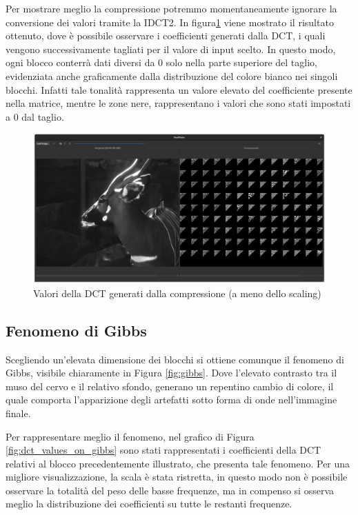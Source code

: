 Per mostrare meglio la compressione potremmo momentaneamente ignorare la conversione dei valori tramite la IDCT2. In figura\ref{fig:compression_values} viene mostrato il risultato ottenuto, dove è possibile osservare i coefficienti generati dalla DCT, i quali vengono successivamente tagliati per il valore di input scelto. In questo modo, ogni blocco conterrà dati diversi da 0 solo nella parte superiore del taglio, evidenziata anche graficamente dalla distribuzione del colore bianco nei singoli blocchi. Infatti tale tonalità rappresenta un valore elevato del coefficiente presente nella matrice, mentre le zone nere, rappresentano i valori che sono stati impostati a 0 dal taglio.

\begin{figure}[h]
	\centering
	\includegraphics[width=1\linewidth]{figures/qt_dct_values}
	\caption{Valori della DCT generati dalla compressione (a meno dello scaling)}
	\label{fig:compression_values}
\end{figure}

\subsection{Fenomeno di Gibbs}

Scegliendo un'elevata dimensione dei blocchi si ottiene comunque il fenomeno di Gibbs, visibile chiaramente in Figura \ref{fig:gibbs}. Dove l'elevato contrasto tra il muso del cervo e il relativo sfondo, generano un repentino cambio di colore, il quale comporta l'apparizione degli artefatti sotto forma di onde nell'immagine finale.

Per rappresentare meglio il fenomeno, nel grafico di Figura \ref{fig:dct_values_on_gibbs} sono stati rappresentati i coefficienti della DCT relativi al blocco precedentemente illustrato, che presenta tale fenomeno. Per una migliore visualizzazione, la scala è stata ristretta, in questo modo non è possibile osservare la totalità del peso delle basse frequenze, ma in compenso si osserva meglio la distribuzione dei coefficienti su tutte le restanti frequenze.

